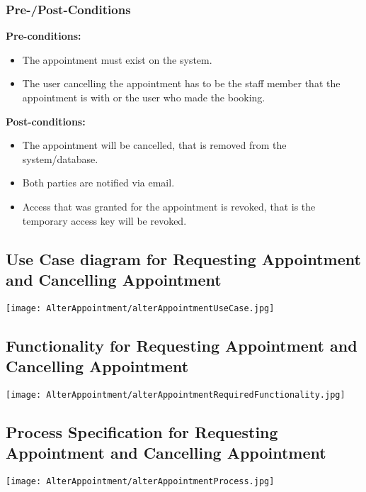\subsubsection{Pre-/Post-Conditions}
\textbf{Pre-conditions:} 
	\begin{itemize}
		\item The appointment must exist on the system.
		\item The user cancelling the appointment has to be the staff member that the appointment is with or the user who made the booking.
	\end{itemize}
\textbf{Post-conditions:} 
	\begin{itemize}
		\item The appointment will be cancelled, that is removed from the system/database.
		\item  Both parties are notified via email.
		\item Access that was granted for the appointment is revoked, that is the temporary access key will be revoked. 
	\end{itemize}

\subsection{Use Case diagram for Requesting Appointment and Cancelling Appointment}
	\texttt{[image: AlterAppointment/alterAppointmentUseCase.jpg]}
	
\subsection{Functionality for Requesting Appointment and Cancelling Appointment}
	\texttt{[image: AlterAppointment/alterAppointmentRequiredFunctionality.jpg]}
	
\subsection{Process Specification for Requesting Appointment and Cancelling Appointment}
	\texttt{[image: AlterAppointment/alterAppointmentProcess.jpg]}


